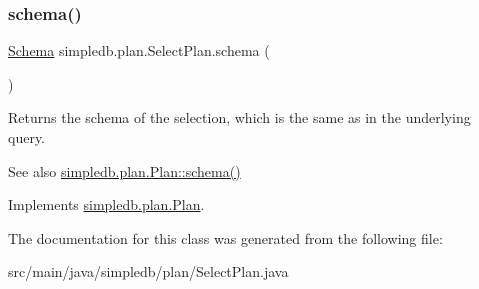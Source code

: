\subsubsection{\texorpdfstring{schema()}{schema()}}
{\footnotesize\ttfamily \hyperlink{classsimpledb_1_1record_1_1Schema}{Schema} simpledb.\+plan.\+Select\+Plan.\+schema (\begin{DoxyParamCaption}{ }\end{DoxyParamCaption})\hspace{0.3cm}{\ttfamily [inline]}}

Returns the schema of the selection, which is the same as in the underlying query. \begin{DoxySeeAlso}{See also}
\hyperlink{interfacesimpledb_1_1plan_1_1Plan_ad0ee1aa2c4e7147e9f8fc6f3301fa986}{simpledb.\+plan.\+Plan\+::schema()} 
\end{DoxySeeAlso}


Implements \hyperlink{interfacesimpledb_1_1plan_1_1Plan_ad0ee1aa2c4e7147e9f8fc6f3301fa986}{simpledb.\+plan.\+Plan}.



The documentation for this class was generated from the following file\+:\begin{DoxyCompactItemize}
\item 
src/main/java/simpledb/plan/Select\+Plan.\+java\end{DoxyCompactItemize}
